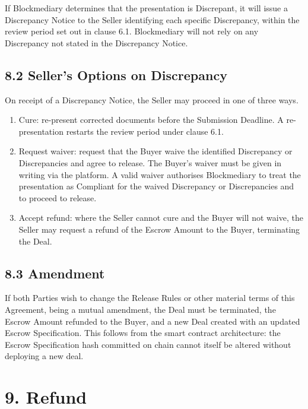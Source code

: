 \documentclass[12pt, a4paper]{article}
\begin{document}
If Blockmediary determines that the presentation is Discrepant, it will issue a
Discrepancy Notice to the Seller identifying each specific Discrepancy, within the review
period set out in clause 6.1. Blockmediary will not rely on any Discrepancy not stated in
the Discrepancy Notice.

\subsection*{8.2 Seller's Options on Discrepancy}

On receipt of a Discrepancy Notice, the Seller may proceed in one of three ways.

\begin{enumerate}[label=(\alph*)]
\item Cure: re-present corrected documents before the Submission Deadline. A
re-presentation restarts the review period under clause 6.1.
\item Request waiver: request that the Buyer waive the identified Discrepancy or
Discrepancies and agree to release. The Buyer's waiver must be given in writing via the
platform. A valid waiver authorises Blockmediary to treat the presentation as Compliant for
the waived Discrepancy or Discrepancies and to proceed to release.
\item Accept refund: where the Seller cannot cure and the Buyer will not waive, the Seller
may request a refund of the Escrow Amount to the Buyer, terminating the Deal.
\end{enumerate}

\subsection*{8.3 Amendment}

If both Parties wish to change the Release Rules or other material terms of this
Agreement, being a mutual amendment, the Deal must be terminated, the Escrow Amount
refunded to the Buyer, and a new Deal created with an updated Escrow Specification. This
follows from the smart contract architecture: the Escrow Specification hash committed on
chain cannot itself be altered without deploying a new deal.

\section*{9. Refund}
\end{document}
